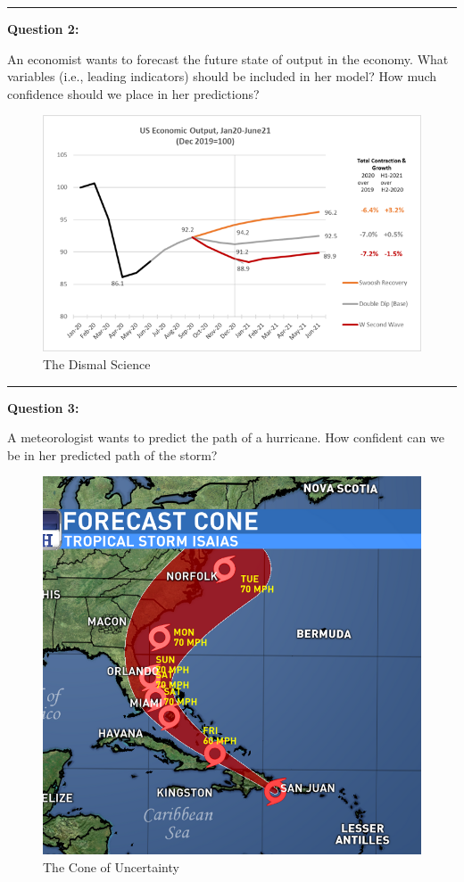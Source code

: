 \documentclass[
]{book}
\begin{document}
\begin{center}\rule{0.5\linewidth}{0.5pt}\end{center}

\textbf{Question 2:}

An economist wants to forecast the future state of output in the economy. What variables (i.e., leading indicators) should be included in her model? How much confidence should we place in her predictions?

\begin{figure}

{\centering \includegraphics[width=0.8\linewidth]{images/ECONOMIC} 

}

\caption{The Dismal Science}\label{fig:unnamed-chunk-4}
\end{figure}

\begin{center}\rule{0.5\linewidth}{0.5pt}\end{center}

\textbf{Question 3:}

A meteorologist wants to predict the path of a hurricane. How confident can we be in her predicted path of the storm?

\begin{figure}

{\centering \includegraphics[width=0.7\linewidth]{images/FORECASTCONE} 

}

\caption{The Cone of Uncertainty}\label{fig:unnamed-chunk-5}
\end{figure}
\end{document}
